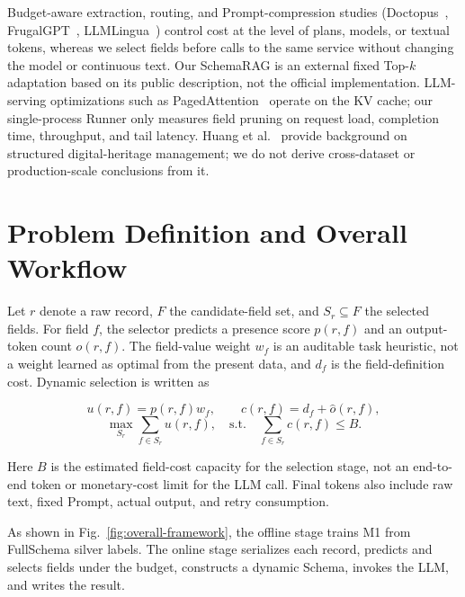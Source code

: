 \documentclass[runningheads]{llncs}
\newcommand{\method}{M1}
\newcommand{\full}{FullSchema}
\newcommand{\schemarag}{SchemaRAG}
\begin{document}
Budget-aware extraction, routing, and Prompt-compression studies (Doctopus~\cite{doctopus}, FrugalGPT~\cite{frugalgpt}, LLMLingua~\cite{llmlingua}) control cost at the level of plans, models, or textual tokens, whereas we select fields before calls to the same service without changing the model or continuous text. Our \schemarag{} is an external fixed Top-$k$ adaptation based on its public description, not the official implementation. LLM-serving optimizations such as PagedAttention~\cite{pagedattention} operate on the KV cache; our single-process Runner only measures field pruning on request load, completion time, throughput, and tail latency. Huang et al.~\cite{huang2023} provide background on structured digital-heritage management; we do not derive cross-dataset or production-scale conclusions from it.

\section{Problem Definition and Overall Workflow}

Let $r$ denote a raw record, $F$ the candidate-field set, and $S_r\subseteq F$ the selected fields. For field $f$, the selector predicts a presence score $p(r,f)$ and an output-token count $\hat{o}(r,f)$. The field-value weight $w_f$ is an auditable task heuristic, not a weight learned as optimal from the present data, and $d_f$ is the field-definition cost. Dynamic selection is written as

\begin{equation}
 u(r,f)=p(r,f)w_f,
 \qquad c(r,f)=d_f+\hat{o}(r,f),
 \label{eq:utility-cost}
\end{equation}
\begin{equation}
 \max_{S_r}\sum_{f\in S_r}u(r,f),
  \quad \mathrm{s.t.}\quad \sum_{f\in S_r}c(r,f)\leq B.
\end{equation}

Here $B$ is the estimated field-cost capacity for the selection stage, not an end-to-end token or monetary-cost limit for the LLM call. Final tokens also include raw text, fixed Prompt, actual output, and retry consumption.

As shown in Fig.~\ref{fig:overall-framework}, the offline stage trains \method{} from \full{} silver labels. The online stage serializes each record, predicts and selects fields under the budget, constructs a dynamic Schema, invokes the LLM, and writes the result.
\end{document}

